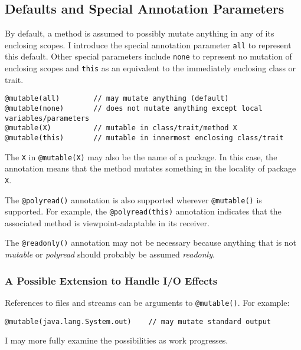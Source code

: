\documentclass[letterpaper,11pt]{article}
\newcommand{\code}[1]{\lstinline$#1$}
\theoremstyle{definition}
\theoremstyle{remark}
\begin{document}

\subsection{Defaults and Special Annotation Parameters}

By default, a method is assumed to possibly mutate anything in any of its
enclosing scopes. I introduce the special annotation parameter \code{all} to represent
this default. Other special parameters include \code{none} to represent
no mutation of enclosing scopes and \code{this} as an equivalent to the immediately
enclosing class or trait.

\begin{lstlisting}
@mutable(all)        // may mutate anything (default)
@mutable(none)       // does not mutate anything except local variables/parameters
@mutable(X)          // mutable in class/trait/method X
@mutable(this)       // mutable in innermost enclosing class/trait
\end{lstlisting}

The \code{X} in \code{@mutable(X)} may also be the name of a package.
In this case, the annotation means that the method mutates
something in the locality of package \code{X}.

The \code{@polyread()} annotation is also supported wherever \code{@mutable()}
is supported. For example, the \code{@polyread(this)} annotation
indicates that the associated method is viewpoint-adaptable in its receiver.

The \code{@readonly()} annotation may not be necessary because anything
that is not \emph{mutable} or \emph{polyread} should probably be assumed
\emph{readonly}.

\subsubsection{A Possible Extension to Handle I/O Effects}

References to files and streams can be arguments to \code{@mutable()}.
For example:

\begin{lstlisting}
@mutable(java.lang.System.out)    // may mutate standard output
\end{lstlisting}
I may more fully examine the possibilities as work progresses.
\end{document}
